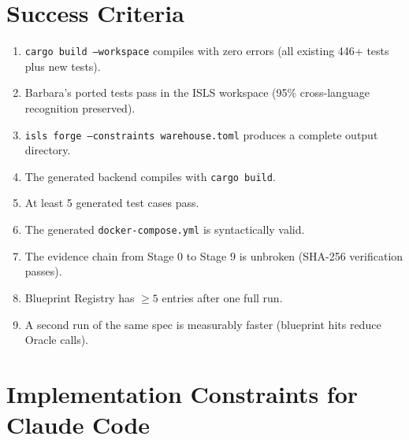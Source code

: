 \documentclass[11pt,a4paper]{article}
\begin{document}
\section{Success Criteria}

\begin{enumerate}
\item \texttt{cargo build --workspace} compiles with zero errors
  (all existing 446+ tests plus new tests).
\item Barbara's ported tests pass in the ISLS workspace
  (95\% cross-language recognition preserved).
\item \texttt{isls forge --constraints warehouse.toml} produces
  a complete output directory.
\item The generated backend compiles with \texttt{cargo build}.
\item At least 5 generated test cases pass.
\item The generated \texttt{docker-compose.yml} is syntactically valid.
\item The evidence chain from Stage 0 to Stage 9 is unbroken
  (SHA-256 verification passes).
\item Blueprint Registry has $\geq 5$ entries after one full run.
\item A second run of the same spec is measurably faster (blueprint
  hits reduce Oracle calls).
\end{enumerate}

\section{Implementation Constraints for Claude Code}
\end{document}
